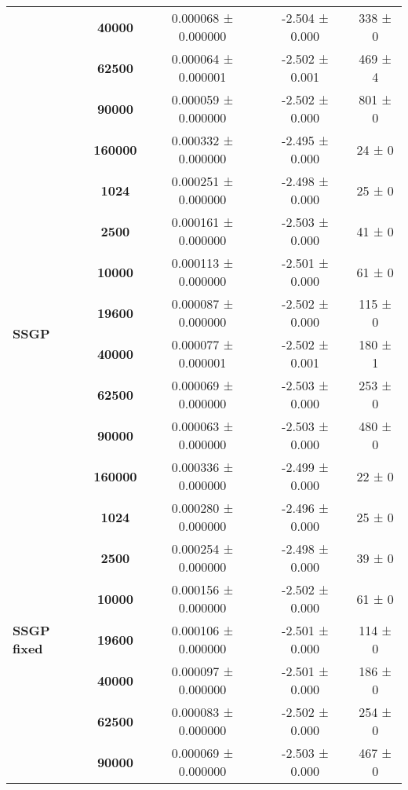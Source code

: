 \begin{tabular}{lcccc}
           & \textbf{40000 } &  0.000068 ± 0.000000 &  -2.504 ± 0.000 &    338 ± 0 \\
           & \textbf{62500 } &  0.000064 ± 0.000001 &  -2.502 ± 0.001 &    469 ± 4 \\
           & \textbf{90000 } &  0.000059 ± 0.000000 &  -2.502 ± 0.000 &    801 ± 0 \\
           & \textbf{160000} &  0.000332 ± 0.000000 &  -2.495 ± 0.000 &     24 ± 0 \\
\cline{1-5}
\multirow{8}{*}{\textbf{SSGP}} & \textbf{1024  } &  0.000251 ± 0.000000 &  -2.498 ± 0.000 &     25 ± 0 \\
           & \textbf{2500  } &  0.000161 ± 0.000000 &  -2.503 ± 0.000 &     41 ± 0 \\
           & \textbf{10000 } &  0.000113 ± 0.000000 &  -2.501 ± 0.000 &     61 ± 0 \\
           & \textbf{19600 } &  0.000087 ± 0.000000 &  -2.502 ± 0.000 &    115 ± 0 \\
           & \textbf{40000 } &  0.000077 ± 0.000001 &  -2.502 ± 0.001 &    180 ± 1 \\
           & \textbf{62500 } &  0.000069 ± 0.000000 &  -2.503 ± 0.000 &    253 ± 0 \\
           & \textbf{90000 } &  0.000063 ± 0.000000 &  -2.503 ± 0.000 &    480 ± 0 \\
           & \textbf{160000} &  0.000336 ± 0.000000 &  -2.499 ± 0.000 &     22 ± 0 \\
\cline{1-5}
\multirow{7}{*}{\textbf{SSGP fixed}} & \textbf{1024  } &  0.000280 ± 0.000000 &  -2.496 ± 0.000 &     25 ± 0 \\
           & \textbf{2500  } &  0.000254 ± 0.000000 &  -2.498 ± 0.000 &     39 ± 0 \\
           & \textbf{10000 } &  0.000156 ± 0.000000 &  -2.502 ± 0.000 &     61 ± 0 \\
           & \textbf{19600 } &  0.000106 ± 0.000000 &  -2.501 ± 0.000 &    114 ± 0 \\
           & \textbf{40000 } &  0.000097 ± 0.000000 &  -2.501 ± 0.000 &    186 ± 0 \\
           & \textbf{62500 } &  0.000083 ± 0.000000 &  -2.502 ± 0.000 &    254 ± 0 \\
           & \textbf{90000 } &  0.000069 ± 0.000000 &  -2.503 ± 0.000 &    467 ± 0 \\
\bottomrule
\end{tabular}
